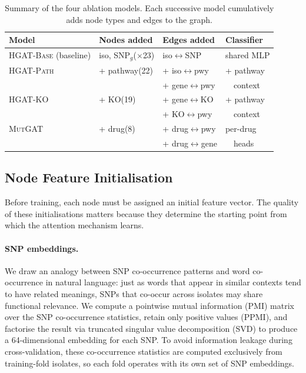 \documentclass{article}
\theoremstyle{plain}
\theoremstyle{definition}
\theoremstyle{remark}
\begin{document}
\begin{table}[t]
\caption{Summary of the four ablation models. Each successive model cumulatively adds node types and edges to the graph.}
\label{tab:arms}
\vskip 0.1in
\begin{center}
\begin{small}
\begin{tabular}{llll}
\toprule
Model & Nodes added & Edges added & Classifier \\
\midrule
\textsc{HGAT-Base} {\small(baseline)} & iso, SNP$_g${\small($\times$23)} & iso$\leftrightarrow$SNP & shared MLP \\
\textsc{HGAT-Path} & + pathway{\small(22)} & + iso$\leftrightarrow$pwy & + pathway \\
              &                       & + gene$\leftrightarrow$pwy & \ \ context \\
\textsc{HGAT-KO}   & + KO{\small(19)}      & + gene$\leftrightarrow$KO & + pathway \\
              &                       & + KO$\leftrightarrow$pwy & \ \ context \\
\textsc{MutGAT} & + drug{\small(8)}   & + drug$\leftrightarrow$pwy & per-drug \\
              &                       & + drug$\leftrightarrow$gene & \ \ heads \\
\bottomrule
\end{tabular}
\end{small}
\end{center}
\vskip -0.1in
\end{table}

\subsection{Node Feature Initialisation}
\label{sec:features}

Before training, each node must be assigned an initial feature vector. The quality of these initialisations matters because they determine the starting point from which the attention mechanism learns.

\paragraph{SNP embeddings.}
We draw an analogy between SNP co-occurrence patterns and word co-occurrence in natural language: just as words that appear in similar contexts tend to have related meanings, SNPs that co-occur across isolates may share functional relevance. We compute a pointwise mutual information (PMI) matrix over the SNP co-occurrence statistics, retain only positive values (PPMI), and factorise the result via truncated singular value decomposition (SVD) to produce a 64-dimensional embedding for each SNP. To avoid information leakage during cross-validation, these co-occurrence statistics are computed exclusively from training-fold isolates, so each fold operates with its own set of SNP embeddings.
\end{document}
